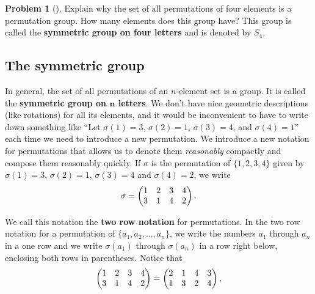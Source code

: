 \documentclass[10pt,]{book}
\newcommand{\terminology}[1]{\textbf{#1}}
\theoremstyle{plain}
\theoremstyle{definition}
\newtheorem{activity}[project]{Problem}
\theoremstyle{definition}
\numberwithin{equation}{chapter}
\newcommand{\amp}{&}
\begin{document}
\begin{activity}[] \label{activity-257}
Explain why the set of all permutations of four elements is a permutation group. How many elements does this group have? This group is called the \terminology{symmetric group on four letters} and is denoted by \(S_4\).%
\end{activity}
\typeout{************************************************}
\typeout{************************************************}
\subsection[{The symmetric group}]{The symmetric group}\label{subsection-60}
In general, the set of all permutations of an \(n\)-element set is a group. It is called the \terminology{symmetric group on \(\mathbf n\) letters}. We don't have nice geometric descriptions (like rotations) for all its elements, and it would be inconvenient to have to write down something like ``Let \(\sigma(1) =3\), \(\sigma(2) =1\), \(\sigma(3)=4\), and \(\sigma(4)=1\)'' each time we need to introduce a new permutation. We introduce a new notation for permutations that allows us to denote them \emph{reasonably} compactly and compose them reasonably quickly. If \(\sigma\) is the permutation of \(\{1,2,3,4\}\) given by \(\sigma(1)=3\), \(\sigma(2)=1\), \(\sigma(3) =4\) and \(\sigma(4) =2\), we write%
\begin{equation*}
\sigma =\left( \begin{matrix}1\amp 2\amp 3\amp 4\cr3\amp 1\amp 4\amp 2
\end{matrix} \right).
\end{equation*}
%
\par
We call this notation the \terminology{two row notation} for permutations. In the two row notation for a permutation of \(\{a_1,a_2,\ldots, a_n\}\), we write the numbers \(a_1\) through \(a_n\) in a one row and we write \(\sigma(a_1)\) through \(\sigma(a_n)\) in a row right below, enclosing both rows in parentheses. Notice that%
\begin{equation*}
\left( \begin{matrix}1\amp 2\amp 3\amp 4\cr3\amp 1\amp 4\amp 2
\end{matrix} \right) = \left(
\begin{matrix}2\amp 1\amp 4\amp 3\cr1\amp 3\amp 2\amp 4
\end{matrix} \right),
\end{equation*}
\end{document}
